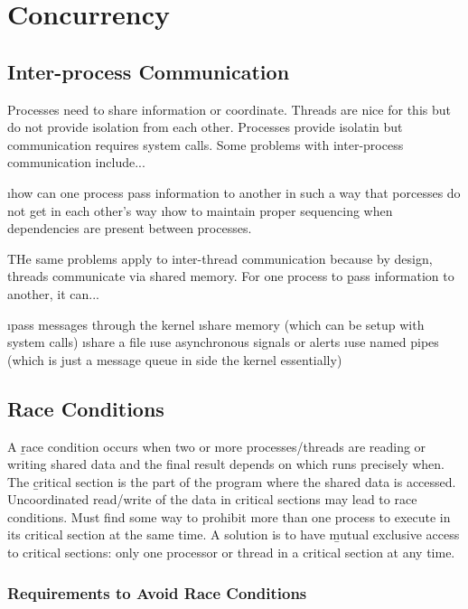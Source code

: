 \documentclass{article}
\begin{document}
\section{Concurrency}

\subsection{Inter-process Communication}

    Processes need to share information or coordinate. Threads are nice for this but do not provide isolation from each other. Processes provide isolatin but communication requires system calls. Some \b{problems with inter-process communication} include...

    \bl 
    \i how can one process pass information to another in such a way that porcesses do not get in each other's way
    \i how to maintain proper sequencing when dependencies are present between processes. 
    \el 

    \noindent THe same problems apply to inter-thread communication because by design, threads communicate via shared memory. For one process to \b{pass information} to another, it can...

    \bl 
    \i pass messages through the kernel
    \i share memory (which can be setup with system calls)
    \i share a file 
    \i use asynchronous signals or alerts
    \i use named pipes (which is just a message queue in side the kernel essentially)
    \el 
    
\subsection{Race Conditions}

    A \b{race condition} occurs when two or more processes/threads are reading or writing shared data and the final result depends on which runs precisely when. The \b{critical section} is the part of the program where the shared data is accessed. Uncoordinated read/write of the data in critical sections may lead to race conditions. Must find some way to prohibit more than one process to execute in its critical section at the same time. A solution is to have \b{mutual exclusive} access to critical sections: only one processor or thread in a critical section at any time. 

    \subsubsection{Requirements to Avoid Race Conditions}
\end{document}

